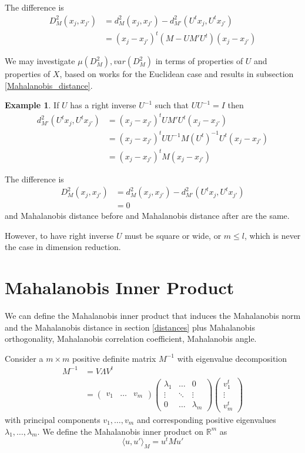 \documentclass[11pt]{amsart}
\theoremstyle{definition}
\newtheorem{example}[theorem]{Example}
\begin{document}
The difference is
\begin{align*}
D_M^2 (x_j, x_{j'}) & = d_M^2 (x_j, x_{j'}) - d_{M'}^2 (U^t x_j, U^t x_{j'}) \\
 & = (x_j - x_{j'})^t (M - UM' U^t) (x_j - x_{j'})
\end{align*}

We may investigate $\mu(D_M^2), var(D_M^2)$ in terms of properties of $U$ and properties of $X$, based on works for the Euclidean case and results in subsection \ref{Mahalanobis_distance}.

\begin{example} If $U$ has a right inverse $U^{-1}$ such that $U U^{-1} = I$ then
\begin{align*}
d_{M'}^2 (U^t x_j, U^t x_{j'}) & = (x_j - x_{j'})^t UM' U^t (x_j - x_{j'}) \\
& = (x_j - x_{j'})^t UU^{-1} M (U^t)^{-1} U^t (x_j - x_{j'}) \\
 & = (x_j - x_{j'})^t M (x_j - x_{j'})
\end{align*}

The difference is
\begin{align*}
D_M^2 (x_j, x_{j'}) & = d_M^2 (x_j, x_{j'}) - d_{M'}^2 (U^t x_j, U^t x_{j'}) \\
 & = 0
\end{align*}
and Mahalanobis distance before and Mahalanobis distance after are the same.

However, to have right inverse $U$ must be square or wide, or $m \leq l$, which is never the case in dimension reduction.
\end{example}

\section{Mahalanobis Inner Product} We can define the Mahalanobis inner product that induces the Mahalanobis norm and the Mahalanobis distance in section \ref{distances} plus Mahalanobis orthogonality, Mahalanobis correlation coefficient, Mahalanobis angle.

Consider a $m \times m$ positive definite matrix $M^{-1}$
with eigenvalue decomposition
\begin{align*}
M^{-1} & = V \Lambda V^t \\
 & = \left( \begin{array}{ccc} v_1 & \dots & v_m \end{array} \right)
\left( \begin{array}{ccc} \lambda_1 & \dots & 0 \\ \vdots & \ddots & \vdots \\ 0 & \dots & \lambda_m \end{array} \right)
\left( \begin{array}{c} v_1^t \\ \vdots \\ v_m^t \end{array} \right)
\end{align*}
with principal components $v_1, \dots , v_m$ and corresponding positive eigenvalues $\lambda_1, \dots , \lambda_m$.
\dfn \label{Mahalanobis_inner_product_coordinate} We define the Mahalanobis inner product on $\mathbb{R}^m$ as
$$\langle u, u' \rangle_M = u^t M u'$$
\end{document}
